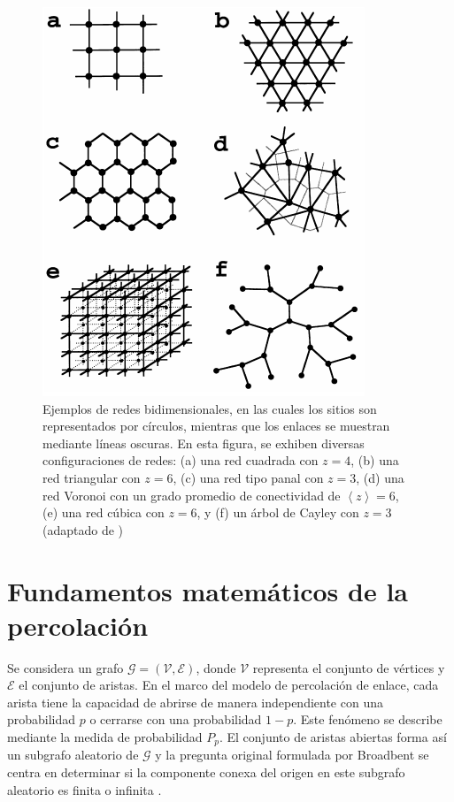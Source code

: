 \begin{figure}[ht]
	\centering\includegraphics[width=\imsize]{distitnasredes.png}
	\caption[Ejemplos de redes bidimensionales.]{ Ejemplos de redes bidimensionales, en las cuales los sitios son representados por círculos, mientras que los enlaces se muestran mediante líneas oscuras. En esta figura, se exhiben diversas configuraciones de redes: (a) una red cuadrada con  $z=4$, (b) una red triangular con  $z=6$, (c) una red tipo panal con $z=3$, (d) una red Voronoi con un grado promedio de conectividad de $\left\langle z \right\rangle = 6$, (e) una red cúbica con  $z=6$, y (f) un árbol de Cayley con  $z=3$ (adaptado de \protect\cite{berkowitz_percolation_1998})}\label{fig:distitnasredes}
\end{figure}






\section{Fundamentos matemáticos de la percolación}\label{sec:matematicaspercolacion}

Se considera un grafo $\mathcal{G}=(\mathcal{V},\mathcal{E})$, donde $\mathcal{V}$ representa el conjunto de vértices y $\mathcal{E}$ el conjunto de aristas. En el marco del modelo de percolación de enlace, cada arista tiene la capacidad de abrirse de manera independiente con una probabilidad $p$ o cerrarse con una probabilidad $1-p$. Este fenómeno se describe mediante la medida de probabilidad $P_p$. El conjunto de aristas abiertas forma así un subgrafo aleatorio de $\mathcal{G}$ y la pregunta original formulada por Broadbent se centra en determinar si la componente conexa del origen en este subgrafo aleatorio es finita o infinita \cite{beffara_percolation_2006}.



